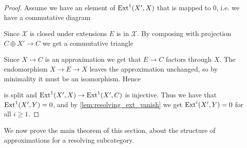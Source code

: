 \begin{lemma}
\begin{proof}
		Assume we have an element of $\operatorname{Ext}^1(X', X)$ that is mapped to 0, i.e. we have a commutative diagram
		\begin{center}
		\end{center}
		Since $\mathcal X$ is closed under extensions $E$ is in $\mathcal X$. By composing with projection $C\oplus X' \to C$ we get a commutative triangle
		\begin{center}
		\end{center}
		Since $X \to C$ is an approximation we get that $E \to C$ factors through $X$. The endomorphism $X \to E \to X$ leaves the approximation unchanged, so by minimality it must be an isomorphism. Hence 
		\begin{center}
		\end{center}
		is split and $\operatorname{Ext}^1(X', X) \to \operatorname{Ext}^1(X', C)$ is injective. Thus we have that $\operatorname{Ext}^1(X', Y)=0$, and by \cref{lem:resolving_ext_vanish} we get $\operatorname{Ext}^i(X', Y)=0$ for all $i\geq 1$.
	\end{proof}
\end{lemma}

We now prove the main theorem of this section, about the structure of approximations for a resolving subcategory.

